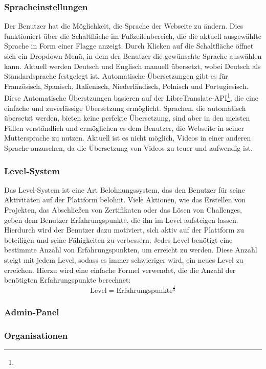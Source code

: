 \documentclass[main.tex]{subfiles}
\begin{document}
    \subsubsection{Spracheinstellungen}
    Der Benutzer hat die Möglichkeit, die Sprache der Webseite zu ändern.
    Dies funktioniert über die Schaltfläche im Fußzeilenbereich, die die aktuell ausgewählte Sprache in Form einer Flagge anzeigt.
    Durch Klicken auf die Schaltfläche öffnet sich ein Dropdown-Menü, in dem der Benutzer die gewünschte Sprache auswählen kann.
    Aktuell werden Deutsch und Englisch manuell übersetzt, wobei Deutsch als Standardsprache festgelegt ist.
    Automatische Übersetzungen gibt es für Französisch, Spanisch, Italienisch, Niederländisch, Polnisch und Portugiesisch.
    Diese Automatische Überstzungen basieren auf der LibreTranslate-API\footnote{}, die eine einfache und zuverlässige Übersetzung ermöglicht.
    Sprachen, die automatisch übersetzt werden, bieten keine perfekte Übersetzung, sind aber in den meisten Fällen verständlich und ermöglichen es dem Benutzer, die Webseite in seiner Muttersprache zu nutzen.
    Aktuell ist es nicht möglich, Videos in einer anderen Sprache anzusehen, da die Übersetzung von Videos zu teuer und aufwendig ist.
    \subsubsection{Level-System}
    Das Level-System ist eine Art Belohnungssystem, das den Benutzer für seine Aktivitäten auf der Plattform belohnt.
    Viele Aktionen, wie das Erstellen von Projekten, das Abschließen von Zertifikaten oder das Lösen von Challenges, geben dem Benutzer Erfahrungspunkte, die ihn im Level aufsteigen lassen.
    Hierdurch wird der Benutzer dazu motiviert, sich aktiv auf der Plattform zu beteiligen und seine Fähigkeiten zu verbessern.
    Jedes Level benötigt eine bestimmte Anzahl von Erfahrungspunkten, um erreicht zu werden.
    Diese Anzahl steigt mit jedem Level, sodass es immer schwieriger wird, ein neues Level zu erreichen.
    Hierzu wird eine einfache Formel verwendet, die die Anzahl der benötigten Erfahrungspunkte berechnet:
    \begin{equation}
        \text{Level} = \text{Erfahrungspunkte}^{\frac{1}{3}}
    \end{equation}
    \subsubsection{Admin-Panel}
    \subsubsection{Organisationen}
\end{document}
